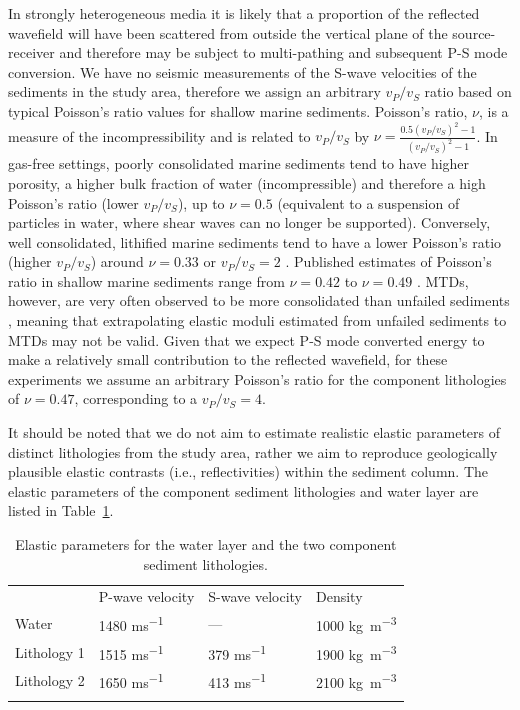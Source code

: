 \documentclass[se,manuscript]{copernicus}
\begin{document}
In strongly heterogeneous media it is likely that a proportion of the reflected wavefield will have been scattered from outside the vertical plane of the source-receiver and therefore may be subject to multi-pathing and subsequent P-S mode conversion.
We have no seismic measurements of the S-wave velocities of the sediments in the study area, therefore we assign an arbitrary $v_P/v_S$ ratio based on typical Poisson's ratio values for shallow marine sediments.
Poisson's ratio, $\nu$, is a measure of the incompressibility and is related to $v_P/v_S$ by $\nu=\frac{0.5(v_P/v_S) ^ 2 - 1}{(v_P/v_S) ^ 2 - 1}$.
In gas-free settings, poorly consolidated marine sediments tend to have higher porosity, a higher bulk fraction of water (incompressible) and therefore a high Poisson's ratio (lower $v_P/v_S$), up to $\nu=0.5$ (equivalent to a suspension of particles in water, where shear waves can no longer be supported).
Conversely, well consolidated, lithified marine sediments tend to have a lower Poisson's ratio (higher $v_P/v_S$) around $\nu=0.33$ or $v_P/v_S=2$ \citep{castagna1985}.
Published estimates of Poisson's ratio in shallow marine sediments range from $\nu=0.42$ to $\nu=0.49$ \citep{hamilton_vpvs_1979, caiti_estimation_1994, provenzano_decimetric-resolution_2018}.
MTDs, however, are very often observed to be more consolidated than unfailed sediments \citep{shipp_physical_2004}, meaning that extrapolating elastic moduli estimated from unfailed sediments to MTDs may not be valid.
Given that we expect P-S mode converted energy to make a relatively small contribution to the reflected wavefield, for these experiments we assume an arbitrary Poisson's ratio for the component lithologies of $\nu=0.47$, corresponding to a $v_P/v_S=4$.

It should be noted that we do not aim to estimate realistic elastic parameters of distinct lithologies from the study area, rather we aim to reproduce geologically plausible elastic contrasts (i.e., reflectivities) within the sediment column.
The elastic parameters of the component sediment lithologies and water layer are listed in Table~\ref{table:component-lithologies}.

\begin{table}
    \caption{Elastic parameters for the water layer and the two component sediment lithologies.}
    \label{table:component-lithologies}
    \begin{tabular}{llll}
        \tophline
        & P-wave velocity & S-wave velocity & Density \\
        \middlehline
        Water & 1480 \unit{ms^{-1}} & --- & 1000 \unit{kg m^{-3}} \\
        Lithology 1 & 1515 \unit{ms^{-1}} & 379 \unit{ms^{-1}} & 1900 \unit{kg m^{-3}} \\
        Lithology 2 & 1650 \unit{ms^{-1}} & 413 \unit{ms^{-1}} & 2100 \unit{kg m^{-3}} \\
        \bottomhline
    \end{tabular}
\end{table}
\end{document}
